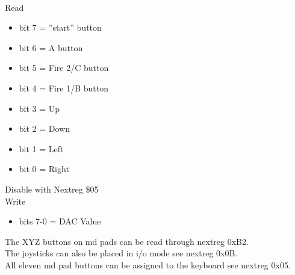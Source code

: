 \\
Read
\begin{itemize}
\item[] bit 7 = ''start'' button
\item[] bit 6 = A button
\item[] bit 5 = Fire 2/C button
\item[] bit 4 = Fire 1/B button
\item[] bit 3 = Up
\item[] bit 2 = Down
\item[] bit 1 = Left
\item[] bit 0 = Right
\end{itemize}
Disable with Nextreg \$05\\
Write
\begin{itemize}
\item[] bits 7-0 = DAC Value
\end{itemize}
The XYZ buttons on md pads can be read through nextreg 0xB2.\\
The joysticks can also be placed in i/o mode see nextreg 0x0B.\\
All eleven md pad buttons can be assigned to the keyboard see nextreg 0x05.
